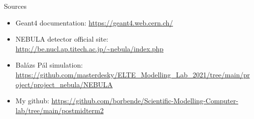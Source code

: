 \documentclass[11pt]{beamer}
\begin{document}
\begin{frame}{Sources}
\begin{itemize}
        \item<tri@1-> Geant4 documentation: \url{https://geant4.web.cern.ch/}
        \vspace{0.3 cm}
        \item<tri@1-> NEBULA detector official site: \url{http://be.nucl.ap.titech.ac.jp/~nebula/index.php}
        \vspace{0.3 cm}
        \item<tri@1-> Balázs Pál simulation: \url{https://github.com/masterdesky/ELTE_Modelling_Lab_2021/tree/main/project/project_nebula/NEBULA}
        \vspace{0.3 cm}
        \item<tri@1-> My github: \url{https://github.com/borbende/Scientific-Modelling-Computer-lab/tree/main/postmidterm2}
\end{itemize}
\end{frame}
\end{document}
